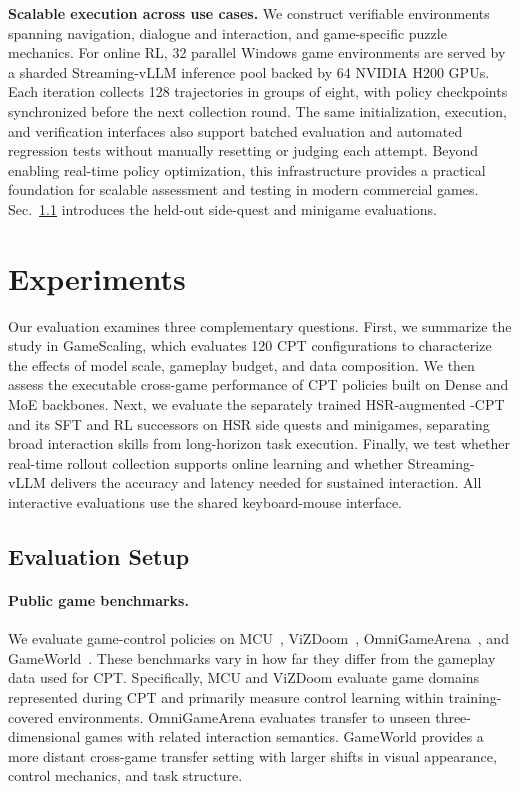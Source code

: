 \textbf{Scalable execution across use cases.}
We construct verifiable environments spanning navigation, dialogue and interaction, and game-specific puzzle mechanics. For online RL, 32 parallel Windows game environments are served by a sharded Streaming-vLLM inference pool backed by 64 NVIDIA H200 GPUs. Each iteration collects 128 trajectories in groups of eight, with policy checkpoints synchronized before the next collection round. The same initialization, execution, and verification interfaces also support batched evaluation and automated regression tests without manually resetting or judging each attempt. Beyond enabling real-time policy optimization, this infrastructure provides a practical foundation for scalable assessment and testing in modern commercial games. Sec.~\ref{sec:evaluation_setup} introduces the held-out side-quest and minigame evaluations.



\section{Experiments}
\label{sec:experiments}

Our evaluation examines three complementary questions. First, we summarize the study in GameScaling, which evaluates 120 CPT configurations to characterize the effects of model scale, gameplay budget, and data composition. We then assess the executable cross-game performance of CPT policies built on Dense and MoE backbones. Next, we evaluate the separately trained HSR-augmented \ourmodel-CPT and its SFT and RL successors on HSR side quests and minigames, separating broad interaction skills from long-horizon task execution. Finally, we test whether real-time rollout collection supports online learning and whether Streaming-vLLM delivers the accuracy and latency needed for sustained interaction. All interactive evaluations use the shared keyboard-mouse interface.


\subsection{Evaluation Setup}
\label{sec:evaluation_setup}

\paragraph{Public game benchmarks.}
We evaluate game-control policies on MCU~\cite{zheng2023mcu}, ViZDoom~\cite{Wydmuch2019ViZdoom}, OmniGameArena~\cite{omnigamearena2026}, and GameWorld~\cite{gameworld2026}.
These benchmarks vary in how far they differ from the gameplay data used for CPT.
Specifically, MCU and ViZDoom evaluate game domains represented during CPT and primarily measure control learning within training-covered environments.
OmniGameArena evaluates transfer to unseen three-dimensional games with related interaction semantics.
GameWorld provides a more distant cross-game transfer setting with larger shifts in visual appearance, control mechanics, and task structure.


